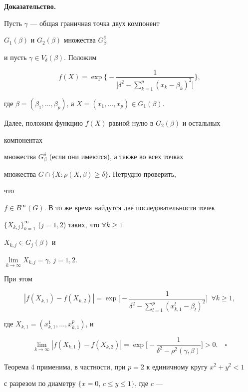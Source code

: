 {\bf Доказательство.}


Пусть $\gamma$ --- общая граничная точка двух компонент


$G_1(\beta)$ и $G_2(\beta)$ множества $G_{\beta}^{\delta}$


и пусть $\gamma\in V_{\delta}(\beta)$. Положим


$$


f(X)=\exp\Bigg\{-\frac{1}{\Big[\delta^2-\sum\limits_{k=1}^p(x_k-


\beta_k)^2\Big]}\Bigg\},


$$


где $\beta=(\beta_1,\dotsc,\beta_p)$, а $X=(x_1,\dotsc,x_p)\in G_1(\beta)$.


Далее, положим функцию $f(X)$ равной нулю в $G_2(\beta)$ и остальных


компонентах


множества $G^{\delta}_{\beta}$ (если они имеются), а также во всех точках


множества $G\cap\{X:\rho(X,\beta)\geqslant \delta\}$. Нетрудно проверить,


что


$f\in B^{\infty}(G)$. В то же время найдутся две последовательности точек


$\{X_{k,j}\}^{\infty}_{k=1}$ ($j=1,2$) таких, что $\forall k\geqslant 1$


$X_{k,j}\in G_j(\beta)$ и


$\lim\limits_{k\to \infty}X_{k,j}=\gamma$, $j=1,2$.


При этом


$$


|f(X_{k,1})-f(X_{k,2})|=\exp\Bigg[-


\dfrac{1}{\delta^2-\sum\limits_{l=1}^p(x^l_{k,1}-\beta_l)^2}\Bigg]


\ \; \forall k\geqslant 1,


$$


где $X_{k,1}=(x^1_{k,1},\dotsc,x^p_{k,1})$, и


$$


\lim_{k\to \infty}|f(X_{k,1})-f(X_{k,2})|=\exp\bigg[


-\frac{1}{\delta^2-\rho^2(\gamma,\beta)}\bigg]>0.\quad\square


$$





Теорема 4 применима, в частности, при $p=2$ к единичному кругу $x^2+y^2<1$


с разрезом по диаметру $\{x=0$, $c\leqslant y\leqslant 1\}$, где $c$ ---


